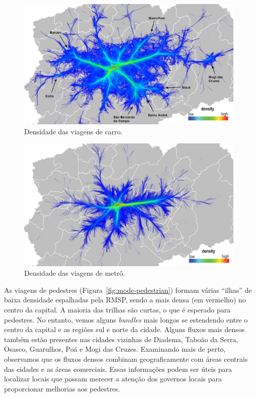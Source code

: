 \begin{figure}[!htb]
  \centering
  \captionsetup{justification=centering}
  \includegraphics[width=0.98\textwidth]{../figuras/mode-car-density-leg.png}
  \caption{Densidade das viagens de carro. \label{fig:mode-car}}
\end{figure}

\begin{figure}[!htb]
  \centering
  \captionsetup{justification=centering}
  \includegraphics[width=0.98\textwidth]{../figuras/mode-subway-density-leg.png}
  \caption{Densidade das viagens de metrô. \label{fig:mode-subway}}
\end{figure}

As viagens de pedestres (Figura~\ref{fig:mode-pedestrian}) formam várias
``ilhas'' de baixa densidade espalhadas pela RMSP, sendo a mais densa (em vermelho)
no centro da capital. A maioria das trilhas são curtas, o que
é esperado para pedestres. No entanto, vemos alguns \emph{bundles} mais longos se estendendo
entre o centro da capital e as regiões sul e norte da cidade. Alguns fluxos mais densos também
estão presentes nas cidades vizinhas de Diadema, Taboão da Serra, Osasco,
Guarulhos, Poá e Mogi das Cruzes. Examinando mais de perto, observamos que
os fluxos densos combinam geograficamente com áreas centrais das cidades e as áreas comerciais. Essas
informações podem ser úteis para localizar locais que possam merecer a atenção
dos governos locais para proporcionar melhorias aos pedestres.

